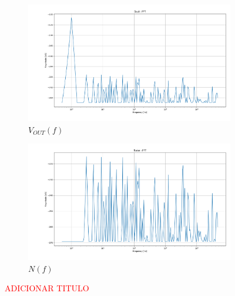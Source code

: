 \begin{figure}[H]
    \begin{subfigure}[b]{0.4\textwidth}
        \centering
        \includegraphics[width=\textwidth]{Images/Dout_ideal.png}
        \caption{$V_{OUT}(f)$}
        \label{fig:Vout_freq_ideal}
    \end{subfigure}%
    \begin{subfigure}[b]{0.4\textwidth}
        \centering
        \includegraphics[width=\textwidth]{Images/Noise_Ideal.png}
        \caption{$N(f)$}
        \label{fig:Noise_freq_ideal}
    \end{subfigure}

    \caption{\textcolor{red}{ADICIONAR TITULO}}
    \label{fig:Noise Ideal}
\end{figure}
